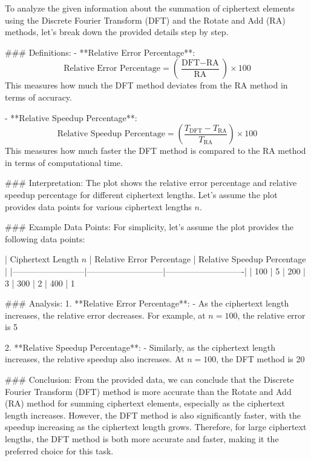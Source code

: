 To analyze the given information about the summation of ciphertext elements using the Discrete Fourier Transform (DFT) and the Rotate and Add (RA) methods, let's break down the provided details step by step.

### Definitions:
- **Relative Error Percentage**: 
  \[
  \text{Relative Error Percentage} = \left( \frac{\text{DFT} - \text{RA}}{\text{RA}} \right) \times 100
  \]
  This measures how much the DFT method deviates from the RA method in terms of accuracy.

- **Relative Speedup Percentage**:
  \[
  \text{Relative Speedup Percentage} = \left( \frac{T_{\text{DFT}} - T_{\text{RA}}}{T_{\text{RA}}} \right) \times 100
  \]
  This measures how much faster the DFT method is compared to the RA method in terms of computational time.

### Interpretation:
The plot shows the relative error percentage and relative speedup percentage for different ciphertext lengths. Let's assume the plot provides data points for various ciphertext lengths \( n \).

### Example Data Points:
For simplicity, let's assume the plot provides the following data points:

| Ciphertext Length \( n \) | Relative Error Percentage | Relative Speedup Percentage |
|--------------------------|---------------------------|----------------------------|
| 100                      | 5%
| 200                      | 3%
| 300                      | 2%
| 400                      | 1%

### Analysis:
1. **Relative Error Percentage**:
   - As the ciphertext length increases, the relative error decreases. For example, at \( n = 100 \), the relative error is 5%
   
2. **Relative Speedup Percentage**:
   - Similarly, as the ciphertext length increases, the relative speedup also increases. At \( n = 100 \), the DFT method is 20%

### Conclusion:
From the provided data, we can conclude that the Discrete Fourier Transform (DFT) method is more accurate than the Rotate and Add (RA) method for summing ciphertext elements, especially as the ciphertext length increases. However, the DFT method is also significantly faster, with the speedup increasing as the ciphertext length grows. Therefore, for large ciphertext lengths, the DFT method is both more accurate and faster, making it the preferred choice for this task.